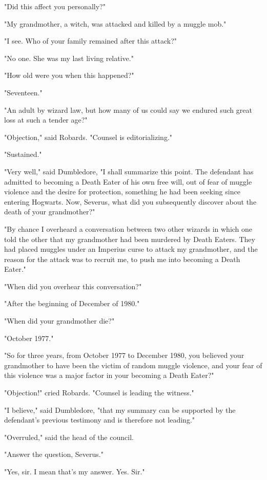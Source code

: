\documentclass[a4paper,11pt]{article}
\begin{document}
"Did this affect you personally?"

"My grandmother, a witch, was attacked and killed by a muggle mob."

"I see. Who of your family remained after this attack?"

"No one. She was my last living relative."

"How old were you when this happened?"

"Seventeen."

"An adult by wizard law, but how many of us could say we endured such great loss at such a tender age?"

"Objection," said Robards. "Counsel is editorializing."

"Sustained."

"Very well," said Dumbledore, "I shall summarize this point. The defendant has admitted to becoming a Death Eater of his own free will, out of fear of muggle violence and the desire for protection, something he had been seeking since entering Hogwarts. Now, Severus, what did you subsequently discover about the death of your grandmother?"

"By chance I overheard a conversation between two other wizards in which one told the other that my grandmother had been murdered by Death Eaters. They had placed muggles under an Imperius curse to attack my grandmother, and the reason for the attack was to recruit me, to push me into becoming a Death Eater."

"When did you overhear this conversation?"

"After the beginning of December of 1980."

"When did your grandmother die?"

"October 1977."

"So for three years, from October 1977 to December 1980, you believed your grandmother to have been the victim of random muggle violence, and your fear of this violence was a major factor in your becoming a Death Eater?"

"Objection!" cried Robards. "Counsel is leading the witness."

"I believe," said Dumbledore, "that my summary can be supported by the defendant's previous testimony and is therefore not leading."

"Overruled," said the head of the council.

"Answer the question, Severus."

"Yes, sir. I mean that's my answer. Yes. Sir."
\end{document}
